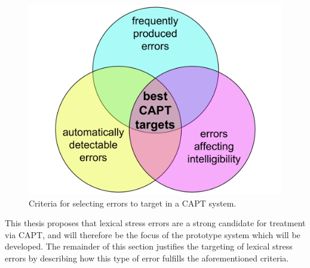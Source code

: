 		\begin{figure}[htb]
			\centering
			\includegraphics[width=.7\textwidth]{../img/error-venn}
			\caption{Criteria for selecting errors to target in a CAPT system.}
			\label{fig:errors}
		\end{figure}
	
	This thesis proposes that lexical stress errors are a strong candidate for treatment via CAPT, and will therefore be the focus of the prototype system which will be developed. The remainder of this section justifies the targeting of lexical stress errors by describing how this type of error fulfills the aforementioned criteria.
	 
	
	


